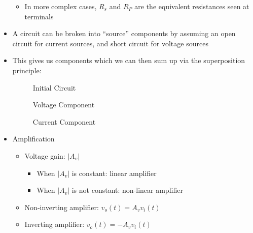 \begin{itemize}
\begin{itemize}
\begin{itemize}
          \end{itemize}

      \item In more complex cases, $R_s$ and $R_P$ are the equivalent resistances seen at terminals

    \end{itemize}

  \item A circuit can be broken into ``source'' components by assuming an open circuit for current sources, and short circuit for voltage sources

  \item This gives us components which we can then sum up via the superposition principle:

    \begin{figure}[H]
      \centering
      
      \caption{Initial Circuit}
      \label{fig:1}
    \end{figure}

    \begin{figure}[H]
      \centering
      
      \caption{Voltage Component}
      \label{fig:2}
    \end{figure}

    \begin{figure}[H]
      \centering
      
      \caption{Current Component}
      \label{fig:3}
    \end{figure}

  \item Amplification

    \begin{itemize}

      \item Voltage gain: $|A_v|$

        \begin{itemize}

          \item When $|A_v|$ is constant: linear amplifier

          \item When $|A_v|$ is not constant: non-linear amplifier

        \end{itemize}

      \item Non-inverting amplifier: $v_o(t)=A_vv_i(t)$

      \item Inverting amplifier: $v_o(t)=-A_vv_i(t)$


\end{itemize}
\end{itemize}
